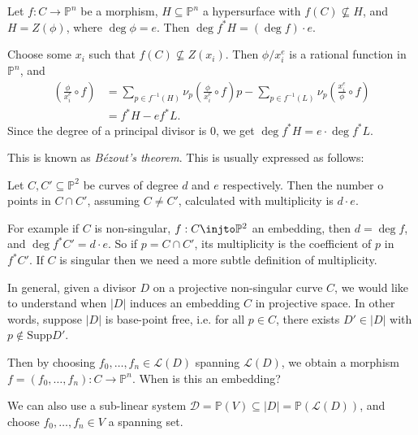 \documentclass[12pt]{article}
\begin{document}
\begin{theorem}
	Let $f : C \to \mathbb{P}^n$ be a morphism, $H \subseteq \mathbb{P}^n$ a hypersurface with $f(C) \not \subseteq H$, and $H = Z(\phi)$, where $\deg \phi = e$. Then $\deg f^\ast H = (\deg f) \cdot e$.
\end{theorem}

\begin{proofbox}
	Choose some $x_i$ such that $f(C) \not \subseteq Z(x_i)$. Then $\phi/x_i^e$ is a rational function in $\mathbb{P}^n$, and
	\begin{align*}
		\left( \frac{\phi}{x_i^e} \circ f\right) &= \sum_{p \in f^{-1}(H)} \nu_p \left( \frac{\phi}{x_i^e} \circ f \right) p - \sum_{ p \in f^{-1}(L)} \nu_p \left( \frac{x_i^e}{\phi} \circ f \right) \\
							 &= f^\ast H - e f^\ast L.
	\end{align*}
	Since the degree of a principal divisor is $0$, we get $\deg f^\ast H = e \cdot \deg f^\ast L$.
\end{proofbox}


\begin{remark}
	This is known as \emph{B\'ezout's theorem}. This is usually expressed as follows:

	Let $C, C' \subseteq \mathbb{P}^2$ be curves of degree $d$ and $e$ respectively. Then the number o points in $C \cap C'$, assuming $C \neq C'$, calculated with multiplicity is $d \cdot e$.
\end{remark}

For example if $C$ is non-singular, $f : C \injto \mathbb{P}^2$ an embedding, then $d = \deg f$, and $\deg f^\ast C' = d \cdot e$. So if $p = C \cap C'$, its multiplicity is the coefficient of $p$ in $f^\ast C'$. If $C$ is singular then we need a more subtle definition of multiplicity.

In general, given a divisor $D$ on a projective non-singular curve $C$, we would like to understand when $|D|$ induces an embedding $C$ in projective space. In other words, suppose $|D|$ is base-point free, i.e. for all $p \in C$, there exists $D' \in |D|$ with $p \not \in \mathrm{Supp}D'$.

Then by choosing $f_0, \ldots, f_n \in \mathcal{L}(D)$ spanning $\mathcal{L}(D)$, we obtain a morphism $f = (f_0, \ldots, f_n) : C \to \mathbb{P}^n$. When is this an embedding?

We can also use a sub-linear system $\mathcal{D} = \mathbb{P}(V) \subseteq |D| = \mathbb{P}(\mathcal{L}(D))$, and choose $f_0, \ldots, f_n \in V$ a spanning set.
\end{document}
